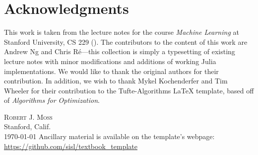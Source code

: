 \chapter*{Acknowledgments}

This work is taken from the lecture notes for the course \textit{Machine Learning} at Stanford University, CS 229 (). %
The contributors to the content of this work are Andrew Ng and Chris R\'e---this collection is simply a typesetting of existing lecture notes with minor modifications and additions of working Julia implementations. We would like to thank the original authors for their contribution.
In addition, we wish to thank Mykel Kochenderfer and Tim Wheeler for their contribution to the Tufte-Algorithms \LaTeX{} template, based off of \textit{Algorithms for Optimization}.\cite{Kochenderfer2019}




\vspace{5ex}
\noindent\textsc{Robert J. Moss}\\
Stanford, Calif.\\
\psetdate\today
\vfill
\noindent Ancillary material is available on the template's webpage:\\
\noindent\url{https://github.com/sisl/textbook_template}

